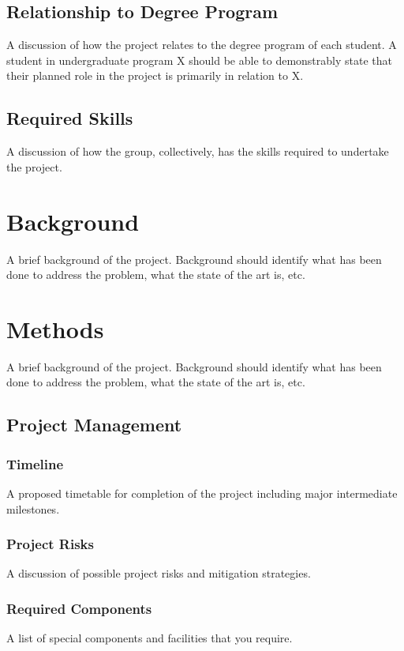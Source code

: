 \documentclass[12pt]{report}
\begin{document}
\section{Relationship to Degree Program}
A discussion of how the project relates to the degree program of each student. A student in undergraduate program X should be able to demonstrably state that their planned role in the project is primarily in relation to X.

\section{Required Skills}
A discussion of how the group, collectively, has the skills required to undertake the project.

\chapter{Background}
A brief background of the project. Background should identify what has been done to address the problem, what the state of the art is, etc.
 
\chapter{Methods}
 A brief background of the project. Background should identify what has been done to address the problem, what the state of the art is, etc.
\section{Project Management}
\subsection{Timeline}
A proposed timetable for completion of the project including major intermediate milestones.

\subsection{Project Risks}
A discussion of possible project risks and mitigation strategies.

\subsection{Required Components}
A list of special components and facilities that you require.
\end{document}
